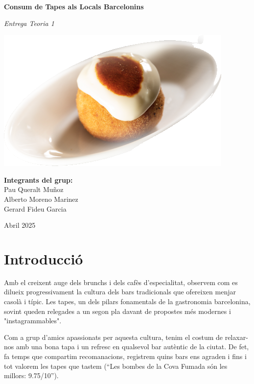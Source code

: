 \documentclass[12pt,a4paper]{article}
\begin{document}
\begin{titlepage}
    \centering
    \vspace*{1.5cm}
    
    {\Huge \textbf{Consum de Tapes als Locals Barcelonins} \par}
    \vspace{0.5cm}
    {\Large \textit{Entrega Teoria 1} \par}
    
    \vspace{2cm}
    \includegraphics[width=0.8\linewidth]{Proyecto nuevo.png}
    
    \vfill
    {\large
    \textbf{Integrants del grup:} \\
    Pau Queralt Muñoz \\
    Alberto Moreno Marinez \\
    Gerard Fideu Garcia
    }
    
    \vspace{1cm}
    {\large Abril 2025 \par}
\end{titlepage}
\tableofcontents
\newpage
\normalfont
\raggedright


\section{Introducció}

Amb el creixent auge dels brunchs i dels cafès d’especialitat, observem com es dilueix progressivament la cultura dels bars tradicionals que ofereixen menjar casolà i típic. Les tapes, un dels pilars fonamentals de la gastronomia barcelonina, sovint queden relegades a un segon pla davant de propostes més modernes i "instagrammables".

Com a grup d’amics apassionats per aquesta cultura, tenim el costum de relaxar-nos amb una bona tapa i un refresc en qualsevol bar autèntic de la ciutat. De fet, fa temps que compartim recomanacions, registrem quins bars ens agraden i fins i tot valorem les tapes que tastem (“Les bombes de la Cova Fumada són les millors: 9.75/10”).
\end{document}
